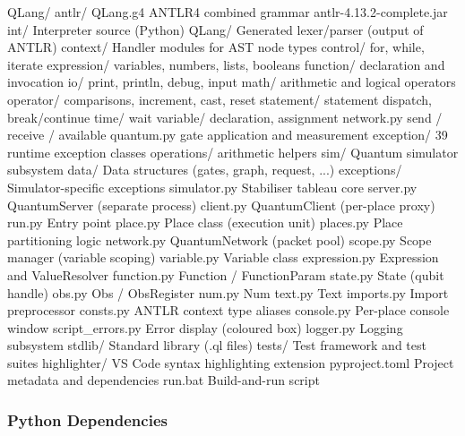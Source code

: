\begin{codebox}
QLang/
  antlr/
    QLang.g4              ANTLR4 combined grammar
    antlr-4.13.2-complete.jar
  int/                    Interpreter source (Python)
    QLang/                Generated lexer/parser (output of ANTLR)
    context/              Handler modules for AST node types
      control/            for, while, iterate
      expression/         variables, numbers, lists, booleans
      function/           declaration and invocation
      io/                 print, println, debug, input
      math/               arithmetic and logical operators
      operator/           comparisons, increment, cast, reset
      statement/          statement dispatch, break/continue
      time/               wait
      variable/           declaration, assignment
      network.py          send / receive / available
      quantum.py          gate application and measurement
    exception/            39 runtime exception classes
    operations/           arithmetic helpers
    sim/                  Quantum simulator subsystem
      data/               Data structures (gates, graph, request, ...)
      exceptions/         Simulator-specific exceptions
      simulator.py        Stabiliser tableau core
      server.py           QuantumServer (separate process)
      client.py           QuantumClient (per-place proxy)
    run.py                Entry point
    place.py              Place class (execution unit)
    places.py             Place partitioning logic
    network.py            QuantumNetwork (packet pool)
    scope.py              Scope manager (variable scoping)
    variable.py           Variable class
    expression.py         Expression and ValueResolver
    function.py           Function / FunctionParam
    state.py              State (qubit handle)
    obs.py                Obs / ObsRegister
    num.py                Num
    text.py               Text
    imports.py            Import preprocessor
    consts.py             ANTLR context type aliases
    console.py            Per-place console window
    script_errors.py      Error display (coloured box)
    logger.py             Logging subsystem
  stdlib/                 Standard library (.ql files)
  tests/                  Test framework and test suites
  highlighter/            VS Code syntax highlighting extension
  pyproject.toml          Project metadata and dependencies
  run.bat                 Build-and-run script
\end{codebox}

\subsubsection{Python Dependencies}

